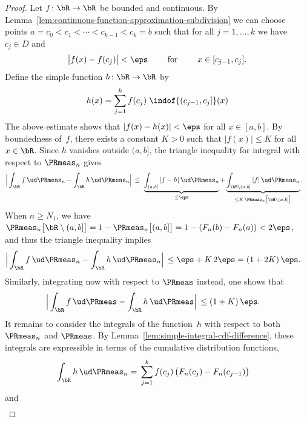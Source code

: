 \begin{proof}
  Let $f \colon \bR \to \bR$ be bounded and continuous.
  By Lemma~\ref{lem:continuous-function-approximation-subdivision}
  we can choose points
  $a=c_0 < c_1 < \cdots < c_{k-1} < c_k = b$ such that
  for all $j = 1 , \ldots , k$ we have $c_j \in D$ and
  \begin{align*}
  \big| f(x) - f(c_j) \big| < \eps
  \qquad \text{ for } \qquad x \in [c_{j-1} , c_j] .
  \end{align*}
  Define the simple function $h \colon \bR \to \bR$ by
  \begin{align*}
  h(x) = \sum_{j=1}^k f(c_j) \; \indof{(c_{j-1},c_j]}(x)
  \end{align*}
  The above estimate shows that $|f(x) - h(x)| < \eps$ for all $x \in [a,b]$.
  By boundedness of~$f$, there exists a constant $K>0$ such that $|f(x)| \leq K$
  for all $x \in \bR$. Since $h$ vanishes outside $(a,b]$,
  the triangle inequality for integral with respect to $\PRmeas_n$ gives
  \begin{align*}
  \Big| \int_{\bR} f \, \ud \PRmeas_n - \int_{\bR} h \, \ud \PRmeas_n \Big|
  \, \leq \; & \, \underbrace{\int_{(a,b]} |f-h| \, \ud \PRmeas_n}_{\leq \eps}
      + \underbrace{\int_{\bR \setminus (a,b]} |f| \, \ud \PRmeas_n}_{%
      \leq K \, \PRmeas_n\big[ \bR \setminus (a,b] \big]} .
  \end{align*}
  When $n \geq N_1$, we have
  $\PRmeas_n\big[ \bR \setminus (a,b] \big]
  = 1 - \PRmeas_n\big[ (a,b] \big] = 1 - (F_n(b) - F_n(a)) < 2 \eps$,
  and thus the triangle inequality implies
  \begin{align*}
  \Big| \int_{\bR} f \, \ud \PRmeas_n - \int_{\bR} h \, \ud \PRmeas_n \Big|
  \, \leq \; & \eps + K \, 2 \eps = (1 + 2K) \, \eps .
  \end{align*}
  Similarly, integrating now with respect to $\PRmeas$ instead, one shows that
  \begin{align*}
  \Big| \int_{\bR} f \, \ud \PRmeas - \int_{\bR} h \, \ud \PRmeas \Big|
  \, \leq \; & (1 + K) \, \eps .
  \end{align*}
  It remains to consider the integrals of the function~$h$ with respect to both
  $\PRmeas_n$ and $\PRmeas$. By Lemma~\ref{lem:simple-integral-cdf-difference},
  these integrals are expressible in terms of the cumulative distribution functions,
  \begin{align*}
  \int_{\bR} h \, \ud \PRmeas_n
  = \; & \sum_{j=1}^k f(c_j) \, \big( F_n(c_j) - F_n(c_{j-1}) \big)
  \end{align*}
  and
  \begin{align*}

\end{align*}
\end{proof}
